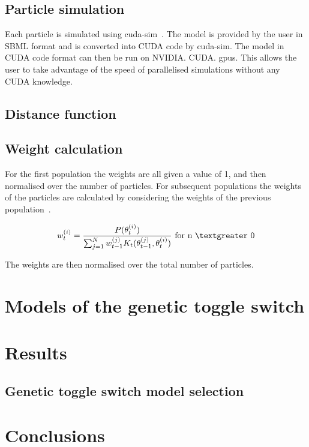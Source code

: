 \subsection{Particle simulation}
\label{sec:sim}
Each particle is simulated using cuda-sim~\autocite{Zhou:2011hp}. The model is provided by the user in SBML format and is converted into CUDA\textsuperscript{\textregistered} code by cuda-sim. The model in CUDA\textsuperscript{\textregistered} code format can then be run on NVIDIA\textsuperscript{\textregistered}. CUDA\textsuperscript{\textregistered}. \acrshort{gpu}s. This allows the user to take advantage of the speed of parallelised simulations without any CUDA\textsuperscript{\textregistered} knowledge. 

\subsection{Distance function}

\subsection{Weight calculation}
\label{sec:weight}
For the first population the weights are all given a value of 1, and then normalised over the number of particles. For subsequent populations the weights of the particles are calculated by considering the weights of the previous population~\autocite{Toni:2009tr}. 

\begin{align}
w_{t}^{(i)} = \frac{P(\theta_{t}^{(i)})}{\sum_{j=1}^N w_{t-1}^{(j)} K_{t}(\theta_{t-1}^{(j)}, \theta_{t}^{(i)})} \text{ for n $\textgreater$  0}
\end{align}
	
The weights are then normalised over the total number of particles. 
    









\section{Models of the genetic toggle switch}
\section{Results}
\subsection{Genetic toggle switch model selection}
\section{Conclusions}
